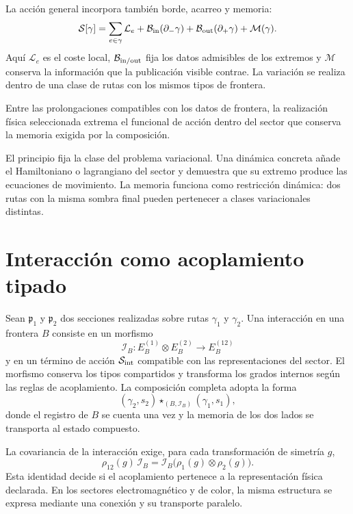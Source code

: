 La acción general incorpora también borde, acarreo y memoria:
\begin{equation}
 \mathcal S[\gamma]
 =\sum_{e\in\gamma}\mathcal L_e
 +\mathcal B_{\rm in}(\partial_-\gamma)
 +\mathcal B_{\rm out}(\partial_+\gamma)
 +\mathcal M(\gamma).
 \label{eq:mt-accion-ruta-general}
\end{equation}
Aquí $\mathcal L_e$ es el coste local, $\mathcal B_{\rm in/out}$ fija los
datos admisibles de los extremos y $\mathcal M$ conserva la información que
la publicación visible contrae. La variación se realiza dentro de una clase
de rutas con los mismos tipos de frontera.

\begin{lecturafisica}[title={Principio de mínima interacción compatible con memoria}]
\label{prin:mt-minima-interaccion}
Entre las prolongaciones compatibles con los datos de frontera, la
realización física seleccionada extrema el funcional de acción dentro del
sector que conserva la memoria exigida por la composición.
\end{lecturafisica}

El principio fija la clase del problema variacional. Una dinámica concreta
añade el Hamiltoniano o lagrangiano del sector y demuestra que su extremo
produce las ecuaciones de movimiento. La memoria funciona como restricción
dinámica: dos rutas con la misma sombra final pueden pertenecer a clases
variacionales distintas.

\section{Interacción como acoplamiento tipado}

Sean $\mathfrak p_1$ y $\mathfrak p_2$ dos secciones realizadas sobre rutas
$\gamma_1$ y $\gamma_2$. Una interacción en una frontera $B$ consiste en
un morfismo
\begin{equation}
 \mathcal I_B:
 E^{(1)}_B\otimes E^{(2)}_B
 \longrightarrow E^{(12)}_B
 \label{eq:mt-interaccion-frontera}
\end{equation}
y en un término de acción $\mathcal S_{\rm int}$ compatible con las
representaciones del sector. El morfismo conserva los tipos compartidos y
transforma los grados internos según las reglas de acoplamiento. La
composición completa adopta la forma
\[
 (\gamma_2,s_2)\star_{(B,\mathcal I_B)}(\gamma_1,s_1),
\]
donde el registro de $B$ se cuenta una vez y la memoria de los dos lados se
transporta al estado compuesto.

La covariancia de la interacción exige, para cada transformación de simetría
$g$,
\begin{equation}
 \rho_{12}(g)\,\mathcal I_B
 =\mathcal I_B\bigl(\rho_1(g)\otimes\rho_2(g)\bigr).
 \label{eq:mt-covariancia-interaccion}
\end{equation}
Esta identidad decide si el acoplamiento pertenece a la representación
física declarada. En los sectores electromagnético y de color, la misma
estructura se expresa mediante una conexión y su transporte paralelo.


